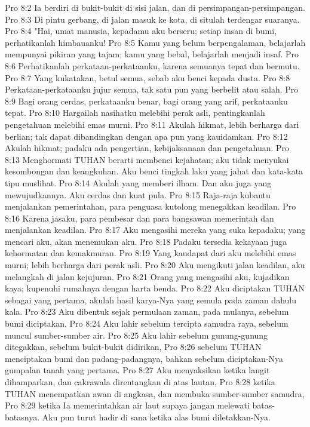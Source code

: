 Pro 8:2  Ia berdiri di bukit-bukit di sisi jalan, dan di persimpangan-persimpangan.
Pro 8:3  Di pintu gerbang, di jalan masuk ke kota, di situlah terdengar suaranya.
Pro 8:4  "Hai, umat manusia, kepadamu aku berseru; setiap insan di bumi, perhatikanlah himbauanku!
Pro 8:5  Kamu yang belum berpengalaman, belajarlah mempunyai pikiran yang tajam; kamu yang bebal, belajarlah menjadi insaf.
Pro 8:6  Perhatikanlah perkataan-perkataanku, karena semuanya tepat dan bermutu.
Pro 8:7  Yang kukatakan, betul semua, sebab aku benci kepada dusta.
Pro 8:8  Perkataan-perkataanku jujur semua, tak satu pun yang berbelit atau salah.
Pro 8:9  Bagi orang cerdas, perkataanku benar, bagi orang yang arif, perkataanku tepat.
Pro 8:10  Hargailah nasihatku melebihi perak asli, pentingkanlah pengetahuan melebihi emas murni.
Pro 8:11  Akulah hikmat, lebih berharga dari berlian; tak dapat dibandingkan dengan apa pun yang kauidamkan.
Pro 8:12  Akulah hikmat; padaku ada pengertian, kebijaksanaan dan pengetahuan.
Pro 8:13  Menghormati TUHAN berarti membenci kejahatan; aku tidak menyukai kesombongan dan keangkuhan. Aku benci tingkah laku yang jahat dan kata-kata tipu muslihat.
Pro 8:14  Akulah yang memberi ilham. Dan aku juga yang mewujudkannya. Aku cerdas dan kuat pula.
Pro 8:15  Raja-raja kubantu menjalankan pemerintahan, para penguasa kutolong menegakkan keadilan.
Pro 8:16  Karena jasaku, para pembesar dan para bangsawan memerintah dan menjalankan keadilan.
Pro 8:17  Aku mengasihi mereka yang suka kepadaku; yang mencari aku, akan menemukan aku.
Pro 8:18  Padaku tersedia kekayaan juga kehormatan dan kemakmuran.
Pro 8:19  Yang kaudapat dari aku melebihi emas murni; lebih berharga dari perak asli.
Pro 8:20  Aku mengikuti jalan keadilan, aku melangkah di jalan kejujuran.
Pro 8:21  Orang yang mengasihi aku, kujadikan kaya; kupenuhi rumahnya dengan harta benda.
Pro 8:22  Aku diciptakan TUHAN sebagai yang pertama, akulah hasil karya-Nya yang semula pada zaman dahulu kala.
Pro 8:23  Aku dibentuk sejak permulaan zaman, pada mulanya, sebelum bumi diciptakan.
Pro 8:24  Aku lahir sebelum tercipta samudra raya, sebelum muncul sumber-sumber air.
Pro 8:25  Aku lahir sebelum gunung-gunung ditegakkan, sebelum bukit-bukit didirikan,
Pro 8:26  sebelum TUHAN menciptakan bumi dan padang-padangnya, bahkan sebelum diciptakan-Nya gumpalan tanah yang pertama.
Pro 8:27  Aku menyaksikan ketika langit dihamparkan, dan cakrawala direntangkan di atas lautan,
Pro 8:28  ketika TUHAN menempatkan awan di angkasa, dan membuka sumber-sumber samudra,
Pro 8:29  ketika Ia memerintahkan air laut supaya jangan melewati batas-batasnya. Aku pun turut hadir di sana ketika alas bumi diletakkan-Nya.
